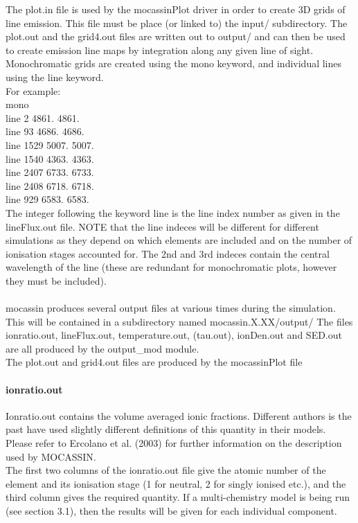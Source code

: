 \documentclass[11pt]{article}
\begin{document}
    The plot.in file is used by the mocassinPlot driver in order to create 3D 
    grids of line emission. This file must be place (or linked to) the input/ 
    subdirectory. The plot.out and the grid4.out files are written out to output/ and 
    can then be used to create emission line
    maps by integration along any given line of sight.      \\
    Monochromatic grids are created using the mono keyword, and individual lines 
    using the line keyword. \\
\noindent    For example:\\
\indent  mono\\
\indent  line 2        4861.   4861.\\
\indent  line 93       4686.   4686.\\
\indent  line 1529     5007.   5007.\\
\indent  line 1540     4363.   4363.\\
\indent  line 2407     6733.   6733.\\
\indent  line 2408     6718.   6718.\\
\indent  line 929      6583.   6583.\\
\noindent The integer following the keyword line is the line index number as given in the 
    lineFlux.out file. NOTE that the line indeces will be different for different 
    simulations as they depend on which elements are included and on the number of 
    ionisation stages accounted for. The 2nd and 3rd indeces contain the central 
    wavelength of the line (these are redundant for monochromatic plots, however
    they must be included).      	\\

\\
    
    {\sc mocassin} produces several output files at various times during the simulation. 
    This will be contained in a subdirectory named mocassin.X.XX/output/
    The files ionratio.out,  lineFlux.out, temperature.out, (tau.out), ionDen.out
    and SED.out are all produced by the output\_mod module. \\
    The plot.out and grid4.out files are produced by the mocassinPlot file\\

    

\paragraph{    ionratio.out}
    Ionratio.out contains the volume averaged ionic fractions. Different authors 
    is the past have used slightly different definitions of this quantity in their 
    models. Please refer to Ercolano et al. (2003) for further information on the 
    description used by MOCASSIN. \\
    The first two columns of the ionratio.out file give the atomic number of the 
    element and its ionisation stage (1 for neutral, 2 for singly ionised etc.), 
    and the third column gives the required quantity.
    If a multi-chemistry model is being run (see section 3.1), then the results 
    will be given for each individual component. \\
\end{document}
